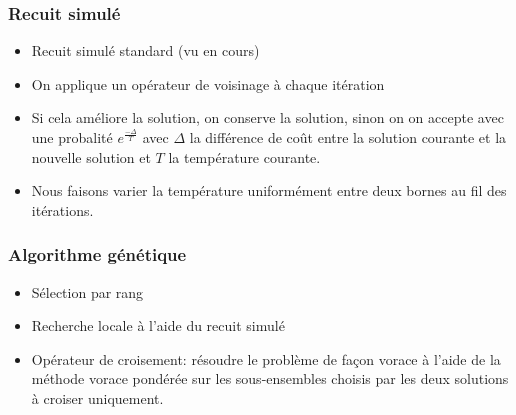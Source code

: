 \documentclass[aspectratio=169,11pt]{beamer}
\begin{document}
	\begin{frame}
		\frametitle{Recuit simulé}
		\begin{itemize}
			\item Recuit simulé standard (vu en cours)
			\item On applique un opérateur de voisinage à chaque itération
			\item Si cela améliore la solution, on conserve la solution, sinon on on accepte avec une
				probalité \(e^{\frac{-\Delta}{T}}\) avec \(\Delta\) la différence de coût
				entre la solution courante et la nouvelle solution et \(T\) la température courante.
			\item Nous faisons varier la température uniformément entre deux bornes au fil des itérations.
		\end{itemize}
	\end{frame}

	\begin{frame}
		\frametitle{Algorithme génétique}
		\begin{itemize}
			\item Sélection par rang
			\item Recherche locale à l'aide du recuit simulé
			\item Opérateur de croisement: résoudre le problème de façon vorace à l'aide de la méthode vorace pondérée
				sur les sous-ensembles choisis par les deux solutions à croiser uniquement.
		\end{itemize}
	\end{frame}
\end{document}

